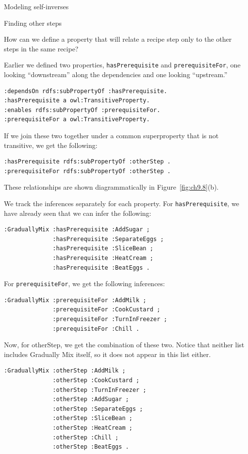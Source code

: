 \begin{challenge}{Modeling self-inverses}
\begin{challenge}{Finding other steps}

How can we define a property that will relate a recipe step only to the
other steps in the same recipe?

\solution

Earlier we defined two properties, \texttt{hasPrerequisite} and \texttt{prerequisiteFor},
one looking ``downstream'' along the dependencies and one looking
``upstream.''

\begin{lstlisting}
:dependsOn rdfs:subPropertyOf :hasPrerequisite.
:hasPrerequisite a owl:TransitiveProperty.
:enables rdfs:subPropertyOf :prerequisiteFor.
:prerequisiteFor a owl:TransitiveProperty.
\end{lstlisting}

If we join these two together under a common superproperty that is not
transitive, we get the following:

\begin{lstlisting}
:hasPrerequisite rdfs:subPropertyOf :otherStep .
:prerequisiteFor rdfs:subPropertyOf :otherStep .
\end{lstlisting}

These relationships are shown diagrammatically in Figure~\ref{fig:ch9.8}(b).

We track the inferences separately for each property. For
\texttt{hasPrerequisite}, we have already seen that we can infer the following:

\begin{lstlisting}
:GraduallyMix :hasPrerequisite :AddSugar ;
              :hasPrerequisite :SeparateEggs ;
              :hasPrerequisite :SliceBean ;
              :hasPrerequisite :HeatCream ;
              :hasPrerequisite :BeatEggs .
\end{lstlisting}

For \texttt{prerequisiteFor}, we get the following inferences:

\begin{lstlisting}
:GraduallyMix :prerequisiteFor :AddMilk ;
              :prerequisiteFor :CookCustard ;
              :prerequisiteFor :TurnInFreezer ;
              :prerequisiteFor :Chill .
\end{lstlisting}

Now, for otherStep, we get the combination of these two. Notice that
neither list includes Gradually
Mix itself, so it does not appear in this list either.

\begin{lstlisting}
:GraduallyMix :otherStep :AddMilk ;
              :otherStep :CookCustard ;
              :otherStep :TurnInFreezer ;
              :otherStep :AddSugar ;
              :otherStep :SeparateEggs ;
              :otherStep :SliceBean ;
              :otherStep :HeatCream ;
              :otherStep :Chill ;
              :otherStep :BeatEggs .
\end{lstlisting}


\end{challenge}
\end{challenge}
